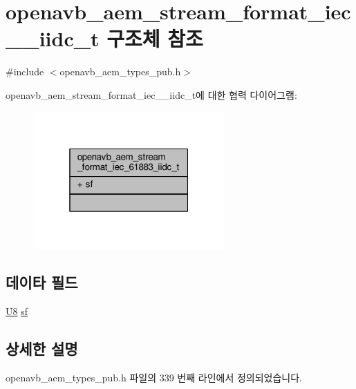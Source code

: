 \hypertarget{structopenavb__aem__stream__format__iec__61883__iidc__t}{}\section{openavb\+\_\+aem\+\_\+stream\+\_\+format\+\_\+iec\+\_\+\_\+iidc\+\_\+t 구조체 참조}
\label{structopenavb__aem__stream__format__iec__61883__iidc__t}


{\ttfamily \#include $<$openavb\+\_\+aem\+\_\+types\+\_\+pub.\+h$>$}



openavb\+\_\+aem\+\_\+stream\+\_\+format\+\_\+iec\+\_\+\_\+iidc\+\_\+t에 대한 협력 다이어그램\+:
\nopagebreak
\begin{figure}[H]
\begin{center}
\leavevmode
\includegraphics[width=208pt]{structopenavb__aem__stream__format__iec__61883__iidc__t__coll__graph}
\end{center}
\end{figure}
\subsection*{데이타 필드}
\begin{DoxyCompactItemize}
\item 
\hyperlink{openavb__types__base__pub_8h_aa63ef7b996d5487ce35a5a66601f3e73}{U8} \hyperlink{structopenavb__aem__stream__format__iec__61883__iidc__t_a153db177c2b7653917dff143e5f755e1}{sf}
\end{DoxyCompactItemize}


\subsection{상세한 설명}


openavb\+\_\+aem\+\_\+types\+\_\+pub.\+h 파일의 339 번째 라인에서 정의되었습니다.



